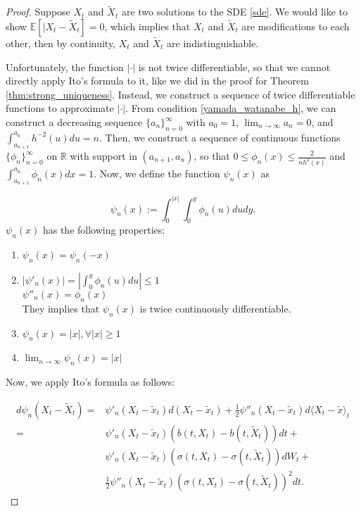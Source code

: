 \documentclass{article}
\begin{document}
\begin{proof}
Suppose $X_t$ and $\tilde{X}_t$ are two solutions to the SDE \eqref{sde}. We would like to show $\mathbb{E}[|X_t-\tilde{X}_t]=0$, which implies that $X_t$ and $\tilde{X}_t$ are modifications to each other, then by continuity, $X_t$ and $\tilde{X}_t$ are indistinguishable.

Unfortunately, the function $|\cdot|$ is not twice differentiable, so that we cannot directly apply Ito's formula to it, like we did in the proof for Theorem \ref{thm:strong_uniqueness}. Instead, we construct a sequence of twice differentiable functions to approximate $|\cdot|$. From condition \eqref{yamada_watanabe_h}, we can construct a decreasing sequence $\{a_n\}_{n=0}^\infty$ with $a_0=1$, $\lim_{n\rightarrow\infty}a_n=0$, and $\int_{a_{n+1}}^{a_n}h^{-2}(u)du=n$. Then, we construct a sequence of continuous functions $\{\phi_n\}_{n=0}^\infty$ on $\mathbb{R}$ with support in $(a_{n+1},a_n)$, so that $0\leq\phi_n(x)\leq\frac{2}{nh^2(x)}$ and $\int_{a_{n+1}}^{a_n}\phi_n(x)dx=1$. Now, we define the function $\psi_n(x)$ as 

\begin{equation*}
\psi_n(x):=\int^{|x|}_0\int^y_0 \phi_n(u)dudy.
\end{equation*}
$\psi_n(x)$ has the following properties:

\begin{enumerate}
\item
$\psi_n(x)=\psi_n(-x)$

\item
$|\psi'_n(x)|=|\int^y_0 \phi_n(u)du|\leq1$\\
$\psi''_n(x)=\phi_n(x)$\\
They implies that $\psi_n(x)$ is twice continuously differentiable.

\item
$\psi_n(x)=|x|,\forall |x|\geq1$

\item
$\lim_{n\rightarrow\infty}\psi_n(x)=|x|$
\end{enumerate}

Now, we apply Ito's formula as follows:

\begin{equation*}
\begin{aligned}
d\psi_n(X_t-\tilde{X}_t)=&\psi'_n(X_t-\tilde{x}_t)d(X_t-\tilde{x}_t)+\frac{1}{2}\psi''_n(X_t-\tilde{x}_t)d\langle X_t-\tilde{x}\rangle_t\\
=&\psi'_n(X_t-\tilde{x}_t)(b(t,X_t)-b(t,\tilde{X}_t))dt+\\
&\psi'_n(X_t-\tilde{x}_t)(\sigma(t,X_t)-\sigma(t,\tilde{X}_t))dW_t+\\
&\frac{1}{2}\psi''_n(X_t-\tilde{x}_t)(\sigma(t,X_t)-\sigma(t,\tilde{X}_t))^2dt.
\end{aligned}
\end{equation*}


\end{proof}
\end{document}
